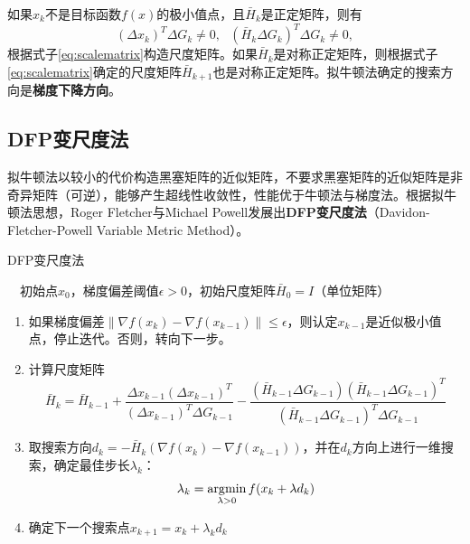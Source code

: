 \begin{theorem}
如果$x_k$不是目标函数$f(x)$的极小值点，且$\bar{H}_k$是正定矩阵，则有
\[
    (\Delta x_k)^T \Delta G_k \ne 0, ~~~(\bar{H}_k \Delta G_k)^T \Delta G_k\ne 0,
\]
根据式子\eqref{eq:scalematrix}构造尺度矩阵。如果$\bar{H}_k$是对称正定矩阵，则根据式子\eqref{eq:scalematrix}确定的尺度矩阵$\bar{H}_{k+1}$也是对称正定矩阵。拟牛顿法确定的搜索方向是\textbf{梯度下降方向}。
\end{theorem}

\subsection{DFP变尺度法}
拟牛顿法以较小的代价构造黑塞矩阵的近似矩阵，不要求黑塞矩阵的近似矩阵是非奇异矩阵（可逆），能够产生超线性收敛性，性能优于牛顿法与梯度法。根据拟牛顿法思想，Roger Fletcher与Michael Powell\cite{fletcher1963rapidly}发展出\textbf{DFP变尺度法}（Davidon-Fletcher-Powell Variable Metric Method）。
\begin{algorithm}[htbp]
        \caption{DFP变尺度法}
        \begin{algorithmic}
            \REQUIRE ~~初始点$x_0$，梯度偏差阈值$\epsilon>0$，初始尺度矩阵$\bar{H}_0 = I$（单位矩阵）\\
            \STATE
            \begin{enumerate}
                \item 如果梯度偏差$\|\nabla f(x_k) - \nabla f(x_{k-1})\| \le \epsilon$，则认定$x_{k-1}$是近似极小值点，停止迭代。否则，转向下一步。
                \item 计算尺度矩阵
                    \[
                        \bar{H}_k = \bar{H}_{k-1} + \frac{\Delta x_{k-1} (\Delta x_{k-1})^T}{(\Delta x_{k-1})^T \Delta G_{k-1}} - \frac{(\bar{H}_{k-1} \Delta G_{k-1}) (\bar{H}_{k-1} \Delta G_{k-1})^T }{(\bar{H}_{k-1} \Delta G_{k-1})^T \Delta G_{k-1}}
                    \]
                \item 取搜索方向$d_k = -\bar{H}_k (\nabla f(x_k) - \nabla f(x_{k-1}))$，并在$d_k$方向上进行一维搜索，确定最佳步长$\lambda_k$：
                    \[
                        \lambda_k = \operatorname*{\mathrm{\arg\!\min}}\limits_{\lambda>0} f(x_k + \lambda d_k)
                    \]
                \item 确定下一个搜索点$x_{k+1} = x_k + \lambda_k d_k$
            \end{enumerate}
            \ENDFOR
        \end{algorithmic}
\end{algorithm}

